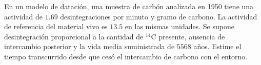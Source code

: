 En un modelo de datación, una muestra de carbón analizada en 1950 tiene una actividad de $1.69$ desintegraciones por minuto y gramo de carbono. La actividad de referencia del material vivo es $13.5$ en las mismas unidades. Se supone desintegración proporcional a la cantidad de $^{14}\mathrm C$ presente, ausencia de intercambio posterior y la vida media suministrada de $5568$ años. Estime el tiempo transcurrido desde que cesó el intercambio de carbono con el entorno.
